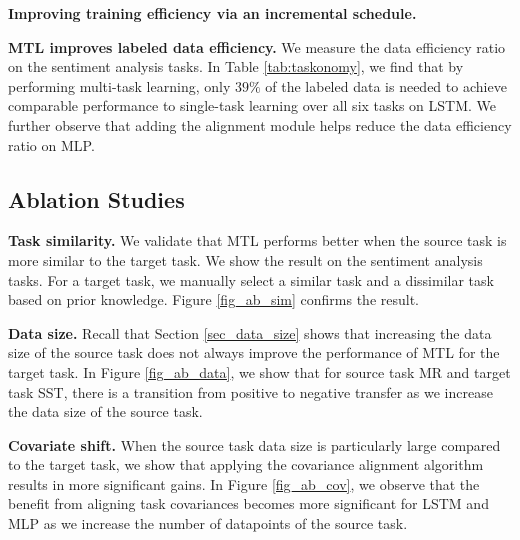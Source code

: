 \textbf{Improving training efficiency via an incremental schedule.}
\todo{}

\textbf{MTL improves labeled data efficiency.}
We measure the data efficiency ratio on the sentiment analysis tasks.
In Table \ref{tab:taskonomy}, we find that by performing multi-task learning, only $39\%$ of the labeled data is needed to achieve comparable performance to single-task learning over all six tasks on LSTM.
We further observe that adding the alignment module helps reduce the data efficiency ratio on MLP.


\subsection{Ablation Studies}


\textbf{Task similarity.} We validate that MTL performs better when the source task is more similar to the target task.
We show the result on the sentiment analysis tasks.
For a target task, we manually select a similar task and a dissimilar task based on prior knowledge.
Figure \ref{fig_ab_sim} confirms the result.


\textbf{Data size.}
Recall that Section \ref{sec_data_size} shows that increasing the data size of the source task does not always improve the performance of MTL for the target task.
In Figure \ref{fig_ab_data}, we show that for source task MR and target task SST, there is a transition from positive to negative transfer as we increase the data size of the source task.

\textbf{Covariate shift.}
When the source task data size is particularly large compared to the target task, we show that applying the covariance alignment algorithm results in more significant gains.
In Figure \ref{fig_ab_cov}, we observe that the benefit from aligning task covariances becomes more significant for LSTM and MLP as we increase the number of datapoints of the source task.


